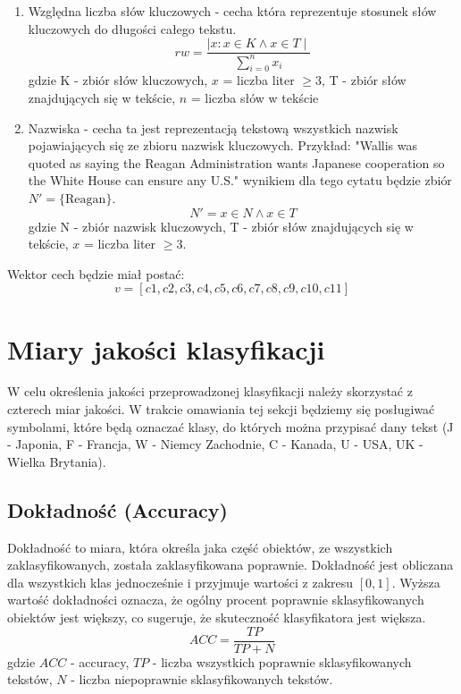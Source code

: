 \documentclass{article}
\begin{document}
\begin{enumerate}
    \item Względna liczba słów kluczowych - cecha która reprezentuje stosunek słów kluczowych do długości całego tekstu. 
        \begin{equation}
            rw = \frac{ \mid x : x \in K \land x \in T \mid}{ \sum_{i=0}^{n} x_i}
        \end{equation}
       gdzie K - zbiór słów kluczowych, \( x \) = liczba liter \( \geq 3 \), T - zbiór słów znajdujących się w tekście, \( n \) = liczba słów w tekście
    \item Nazwiska - cecha ta jest reprezentacją tekstową wszystkich nazwisk pojawiających się ze zbioru nazwisk kluczowych. Przykład: "Wallis was quoted as saying the Reagan Administration wants Japanese cooperation so the White House can ensure any U.S." wynikiem dla tego cytatu będzie zbiór \( N' = \{ \text{Reagan} \} \).
    \begin{equation}
            N' =  x \in N \land x \in T
        \end{equation}
        gdzie N - zbiór nazwisk kluczowych, T - zbiór słów znajdujących się w tekście, \( x \) = liczba liter \( \geq 3 \).
\end{enumerate}

Wektor cech będzie miał postać: 
        \begin{equation}
          v = [c1, c2, c3, c4, c5, c6, c7, c8, c9, c10, c11]
        \end{equation}


\section{Miary jakości klasyfikacji}
W celu określenia jakości przeprowadzonej klasyfikacji należy skorzystać z czterech miar jakości. W trakcie omawiania tej sekcji będziemy się posługiwać symbolami, które będą oznaczać klasy, do których można przypisać dany tekst (J - Japonia, F - Francja, W - Niemcy Zachodnie, C - Kanada, U - USA, UK - Wielka Brytania). 

\subsection{Dokładność (Accuracy)}
Dokładność to miara, która określa jaka część obiektów, ze wszystkich zaklasyfikowanych, została zaklasyfikowana poprawnie. Dokładność jest obliczana dla wszystkich klas jednocześnie i przyjmuje wartości z zakresu \([0, 1]\). Wyższa wartość dokładności oznacza, że ogólny procent poprawnie sklasyfikowanych obiektów jest większy, co sugeruje, że skuteczność klasyfikatora jest większa.
\begin{equation}
    ACC = \frac {TP}{TP + N}
\end{equation}
gdzie \(ACC\) - accuracy, \(TP\) - liczba wszystkich poprawnie sklasyfikowanych tekstów, \(N\) - liczba niepoprawnie sklasyfikowanych tekstów. \\
\end{document}
